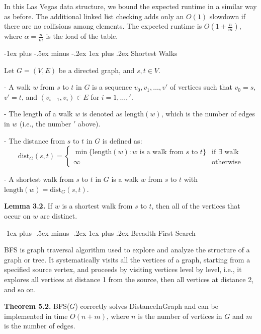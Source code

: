 \documentclass[10pt,landscape]{article}
\makeatletter
\renewcommand{\subsubsection}{\@startsection{subsubsection}{3}{0mm}%
                                {-1ex plus -.5ex minus -.2ex}%
                                {1ex plus .2ex}%
                                {\normalfont\small\bfseries}}
\makeatother
\begin{document}
\begin{multicols*}{3}
\begin{itemize}
\end{itemize}

In this Las Vegas data structure, we bound the expected runtime in a similar way as before. The additional linked list checking adds only an $O(1)$ slowdown if there are no collisions among elements. The expected runtime is $O(1 + \frac{n}{m})$, where $\alpha = \frac{n}{m}$ is the load of the table.

\subsubsection{Shortest Walks}

Let $G = (V, E)$ be a directed graph, and $s, t \in V$.

- A walk $w$ from $s$ to $t$ in $G$ is a sequence $v_0, v_1, \ldots, v'$ of vertices such that $v_0 = s$, $v' = t$, and $(v_{i-1}, v_i) \in E$ for $i = 1, \ldots, '$.

- The length of a walk $w$ is denoted as $\text{length}(w)$, which is the number of edges in $w$ (i.e., the number $'$ above).

- The distance from $s$ to $t$ in $G$ is defined as:
  \[
  \text{dist}_G(s, t) = \begin{cases}
  \min\{\text{length}(w) : w \text{ is a walk from } s \text{ to } t\} & \text{if $\exists$ walk} \\
  \infty & \text{otherwise}
  \end{cases}
  \]

- A shortest walk from $s$ to $t$ in $G$ is a walk $w$ from $s$ to $t$ with $\text{length}(w) = \text{dist}_G(s, t)$.

\textbf{Lemma 3.2.} If $w$ is a shortest walk from $s$ to $t$, then all of the vertices that occur on $w$ are distinct.

\subsubsection{Breadth-First Search}

BFS is graph traversal algorithm used to explore and analyze the structure of a graph or tree. It systematically visits all the vertices of a graph, starting from a specified source vertex, and proceeds by visiting vertices level by level, i.e., it explores all vertices at distance 1 from the source, then all vertices at distance 2, and so on.

\textbf{Theorem 5.2.} BFS($G$) correctly solves DistanceInGraph and can be implemented in time $O(n+m)$, where $n$ is the number of vertices in $G$ and $m$ is the number of edges.


\end{multicols*}
\end{document}
